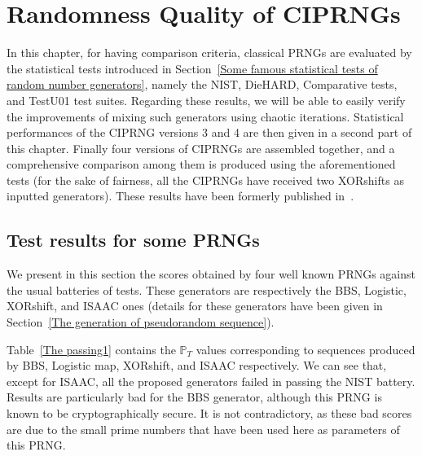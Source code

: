 \chapter{Randomness Quality of CIPRNGs}
\label{Statistical Tests for Randomness}
\minitoc

In this chapter, for having comparison criteria, classical PRNGs are evaluated by the statistical tests introduced in Section~\ref{Some famous statistical tests of random number generators}, namely the NIST, DieHARD, Comparative tests, and TestU01 test suites.
Regarding these results, we will be able to easily verify the improvements of mixing
such generators using chaotic iterations. Statistical performances of the CIPRNG
versions 3 and 4 are then given in a second part of this chapter. 
Finally four versions of CIPRNGs are assembled together, and a 
comprehensive comparison among them is produced using the aforementioned tests 
(for the sake of fairness, all the CIPRNGs have received two XORshifts as
inputted generators). 
These results have been formerly published in~\cite{bfg12a:ip, bfgw11:ij, bfgw11:ip}.

\section{Test results for some PRNGs}
We present in this section the scores obtained by four well known PRNGs
against the usual batteries of tests. These generators are respectively
the BBS, Logistic, XORshift, and ISAAC ones (details for these
generators have been given in Section~\ref{The generation of pseudorandom sequence}).

\label{for nist}

Table~\ref{The passing1} contains the $\mathbb{P}_T$ values 
corresponding to sequences produced by BBS, Logistic map, XORshift, and ISAAC 
respectively. 
We can see that, except for ISAAC, all the proposed generators failed
in passing the NIST battery. Results are particularly bad for the BBS
generator, although this PRNG is known to be cryptographically secure.
It is not contradictory, as these bad scores are due to the small prime 
numbers that have been used here as parameters of this PRNG.


